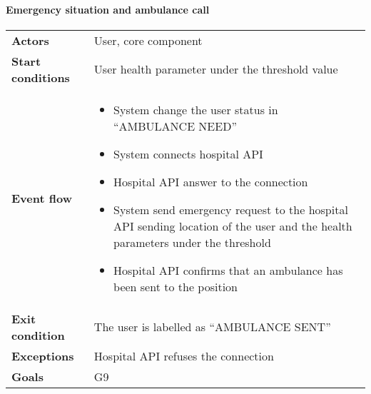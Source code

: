 \paragraph{Emergency situation and ambulance call}
\begin{center}
\begin{table}[H]
\centering
\begin{tabular}{l|l}
\textbf{Actors} & User, core component \\
\textbf{Start conditions} & User health parameter under the threshold value \\
\textbf{Event flow}  & \begin{minipage}[t]{0.7\textwidth}
    \begin{itemize}
       \item System change the user status in “AMBULANCE NEED”
\item System connects hospital API 
\item Hospital API answer to the connection
\item System send emergency request to the hospital API sending location of the user and the health parameters under the threshold
\item Hospital API confirms that an ambulance has been sent to the position

    \end{itemize}
    
\end{minipage} \\
\textbf{Exit condition} & The user is labelled as “AMBULANCE SENT” \\
\textbf{Exceptions} & Hospital API refuses the connection \\
\textbf{Goals} & G9 
\end{tabular}

\end{table}
\end{center}

